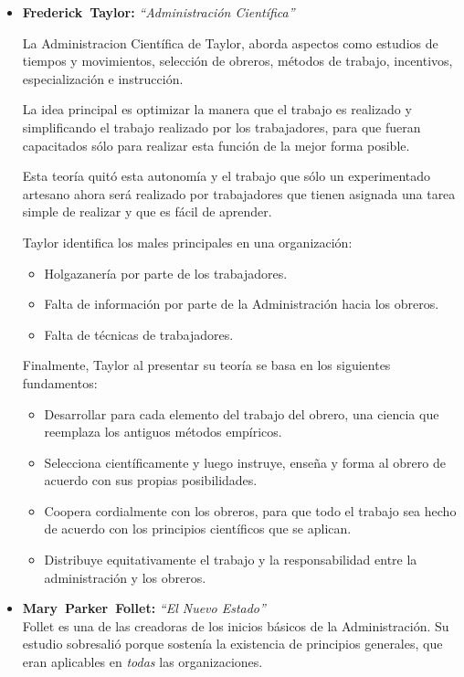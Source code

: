 \begin{itemize}
	\item \textbf{Frederick\ Taylor:} \emph{``Administración Científica''}
	
	La Administracion Científica de Taylor,
	aborda aspectos como estudios de tiempos y movimientos,
	selección de obreros,
	métodos de trabajo,
	incentivos,
	especialización e
	instrucción.

	La idea principal es optimizar la manera que el trabajo es realizado
	y simplificando el trabajo realizado por los trabajadores,
	para que fueran capacitados
	sólo para realizar esta función de la mejor forma posible.

	Esta teoría quitó esta autonomía y
	el trabajo que sólo un experimentado artesano
	ahora será realizado por trabajadores que tienen asignada una tarea simple de realizar
	y que es fácil de aprender. 

	Taylor identifica los males principales en una organización:
	\begin{itemize}
		\item Holgazanería por parte de los trabajadores. 
		\item Falta de información por parte de la Administración hacia los obreros.
		\item Falta de técnicas de trabajadores. 
	\end{itemize}

	Finalmente,
	Taylor al presentar su teoría se basa en los siguientes fundamentos:
	\begin{itemize}
		\item Desarrollar para cada elemento del trabajo del obrero,
			una ciencia que reemplaza los antiguos métodos empíricos. 
		\item Selecciona científicamente y luego instruye,
			enseña y forma al obrero de acuerdo con sus propias posibilidades. 
		\item Coopera cordialmente con los obreros,
			para que todo el trabajo sea hecho
			de acuerdo con los principios científicos que se aplican.
		\item Distribuye equitativamente el trabajo y
			la responsabilidad entre la administración y los obreros. 
	\end{itemize}

	\item \textbf{Mary\ Parker\ Follet:} \emph{``El Nuevo Estado''}\\
	Follet es una de las creadoras de los inicios básicos de la Administración.
	Su estudio sobresalió porque sostenía la existencia
	de principios generales,
	que eran aplicables en \emph{todas} las organizaciones.


\end{itemize}

